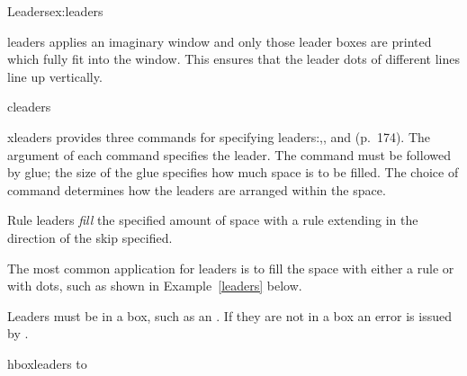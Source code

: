 \begin{texexample}{Leaders}{ex:leaders}
\meaning\dotfill  \par
\meaning\hrulefill\par
\meaning\downbracefill\par
\end{texexample}

\begin{docCommand}{leaders}{}
\tex applies an imaginary window and only those leader boxes are printed which fully fit into the window. This ensures that the leader dots of different lines line up vertically.
\end{docCommand}


\begin{docCommand}{cleaders}{}
\end{docCommand}

\begin{docCommand}{xleaders}{}
\tex  provides three commands for specifying leaders:,,
and (p.~174). The argument of each command specifies the
leader. The command must be followed by glue; the size of the glue specifies
how much space is to be filled. The choice of command determines how
the leaders are arranged within the space.
\end{docCommand}

Rule leaders \textit{fill} the specified amount of space with a rule extending in the direction of the skip
specified. 

The most common application for leaders is to fill the space with either a rule or with dots, such as shown in Example~\ref{leaders} below.


Leaders must be in a box, such as an . If they are not in a box an error is issued by \tex.

\begin{texexample}{}{hboxleaders}
\hbox to 
\end{texexample}

